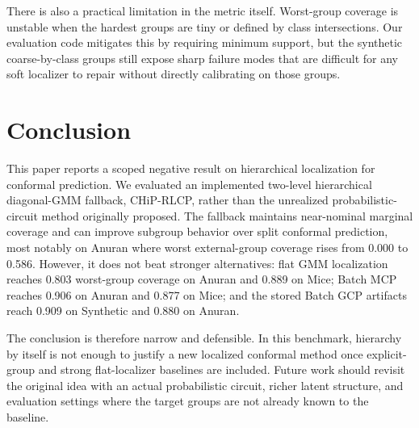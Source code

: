 \documentclass{article}
\newcommand{\chip}{CHiP-RLCP}
\begin{document}
There is also a practical limitation in the metric itself. Worst-group coverage is unstable when the hardest groups are tiny or defined by class intersections. Our evaluation code mitigates this by requiring minimum support, but the synthetic coarse-by-class groups still expose sharp failure modes that are difficult for any soft localizer to repair without directly calibrating on those groups.

\section{Conclusion}
This paper reports a scoped negative result on hierarchical localization for conformal prediction. We evaluated an implemented two-level hierarchical diagonal-GMM fallback, \chip, rather than the unrealized probabilistic-circuit method originally proposed. The fallback maintains near-nominal marginal coverage and can improve subgroup behavior over split conformal prediction, most notably on Anuran where worst external-group coverage rises from 0.000 to 0.586. However, it does not beat stronger alternatives: flat GMM localization reaches 0.803 worst-group coverage on Anuran and 0.889 on Mice; Batch MCP reaches 0.906 on Anuran and 0.877 on Mice; and the stored Batch GCP artifacts reach 0.909 on Synthetic and 0.880 on Anuran.

The conclusion is therefore narrow and defensible. In this benchmark, hierarchy by itself is not enough to justify a new localized conformal method once explicit-group and strong flat-localizer baselines are included. Future work should revisit the original idea with an actual probabilistic circuit, richer latent structure, and evaluation settings where the target groups are not already known to the baseline.

\appendix
\end{document}
